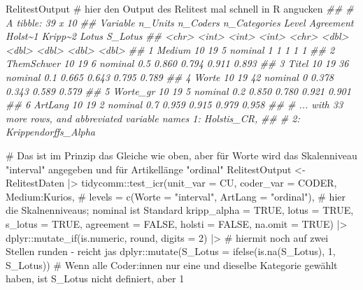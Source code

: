 \documentclass[twoside, pagesize, fontsize=11pt, dvipsnames]{scrreport}
\newenvironment{Shaded}{\begin{snugshade}}{\end{snugshade}}
\newcommand{\AttributeTok}[1]{\textcolor[rgb]{0.40,0.45,0.13}{#1}}
\newcommand{\CommentTok}[1]{\textcolor[rgb]{0.37,0.37,0.37}{#1}}
\newcommand{\ConstantTok}[1]{\textcolor[rgb]{0.56,0.35,0.01}{#1}}
\newcommand{\DecValTok}[1]{\textcolor[rgb]{0.68,0.00,0.00}{#1}}
\newcommand{\DocumentationTok}[1]{\textcolor[rgb]{0.37,0.37,0.37}{\textit{#1}}}
\newcommand{\FunctionTok}[1]{\textcolor[rgb]{0.28,0.35,0.67}{#1}}
\newcommand{\NormalTok}[1]{\textcolor[rgb]{0.00,0.23,0.31}{#1}}
\newcommand{\OtherTok}[1]{\textcolor[rgb]{0.00,0.23,0.31}{#1}}
\newcommand{\SpecialCharTok}[1]{\textcolor[rgb]{0.37,0.37,0.37}{#1}}
\newcommand{\StringTok}[1]{\textcolor[rgb]{0.13,0.47,0.30}{#1}}
\begin{document}
\begin{Shaded}
\begin{Highlighting}[]
\NormalTok{RelitestOutput }\CommentTok{\# hier den Output des Relitest mal schnell in R angucken}
\DocumentationTok{\#\# \# A tibble: 39 x 10}
\DocumentationTok{\#\#   Variable   n\_Units n\_Coders n\_Categories Level   Agreement Holst\textasciitilde{}1 Kripp\textasciitilde{}2 Lotus S\_Lotus}
\DocumentationTok{\#\#   \textless{}chr\textgreater{}        \textless{}int\textgreater{}    \textless{}int\textgreater{}        \textless{}int\textgreater{} \textless{}chr\textgreater{}       \textless{}dbl\textgreater{}   \textless{}dbl\textgreater{}   \textless{}dbl\textgreater{} \textless{}dbl\textgreater{}   \textless{}dbl\textgreater{}}
\DocumentationTok{\#\# 1 Medium          10       19            5 nominal       1     1       1     1       1    }
\DocumentationTok{\#\# 2 ThemSchwer      10       19            6 nominal       0.5   0.860   0.794 0.911   0.893}
\DocumentationTok{\#\# 3 Titel           10       19           36 nominal       0.1   0.665   0.643 0.795   0.789}
\DocumentationTok{\#\# 4 Worte           10       19           42 nominal       0     0.378   0.343 0.589   0.579}
\DocumentationTok{\#\# 5 Worte\_gr        10       19            5 nominal       0.2   0.850   0.780 0.921   0.901}
\DocumentationTok{\#\# 6 ArtLang         10       19            2 nominal       0.7   0.959   0.915 0.979   0.958}
\DocumentationTok{\#\# \# ... with 33 more rows, and abbreviated variable names 1: Holstis\_CR,}
\DocumentationTok{\#\# \#   2: Krippendorffs\_Alpha}

\CommentTok{\# Das ist im Prinzip das Gleiche wie oben, aber für Worte wird das Skalenniveau "interval" angegeben und für Artikellänge "ordinal"}
\NormalTok{RelitestOutput }\OtherTok{\textless{}{-}}\NormalTok{ RelitestDaten }\SpecialCharTok{|\textgreater{}} 
\NormalTok{tidycomm}\SpecialCharTok{::}\FunctionTok{test\_icr}\NormalTok{(}\AttributeTok{unit\_var =}\NormalTok{ CU, }\AttributeTok{coder\_var =}\NormalTok{ CODER, Medium}\SpecialCharTok{:}\NormalTok{Kurios, }\CommentTok{\# }
           \AttributeTok{levels =} \FunctionTok{c}\NormalTok{(}\AttributeTok{Worte =} \StringTok{"interval"}\NormalTok{, }\AttributeTok{ArtLang =} \StringTok{"ordinal"}\NormalTok{), }\CommentTok{\# hier die Skalnenniveaus; nominal ist Standard}
           \AttributeTok{kripp\_alpha =} \ConstantTok{TRUE}\NormalTok{, }\AttributeTok{lotus =} \ConstantTok{TRUE}\NormalTok{, }\AttributeTok{s\_lotus =} \ConstantTok{TRUE}\NormalTok{, }\AttributeTok{agreement =} \ConstantTok{FALSE}\NormalTok{, }\AttributeTok{holsti =} \ConstantTok{FALSE}\NormalTok{, }\AttributeTok{na.omit =} \ConstantTok{TRUE}\NormalTok{) }\SpecialCharTok{|\textgreater{}} 
\NormalTok{    dplyr}\SpecialCharTok{::}\FunctionTok{mutate\_if}\NormalTok{(is.numeric, round, }\AttributeTok{digits =} \DecValTok{2}\NormalTok{) }\SpecialCharTok{|\textgreater{}}  \CommentTok{\# hiermit noch auf zwei Stellen runden {-} reicht jas}
\NormalTok{    dplyr}\SpecialCharTok{::}\FunctionTok{mutate}\NormalTok{(}\AttributeTok{S\_Lotus =} \FunctionTok{ifelse}\NormalTok{(}\FunctionTok{is.na}\NormalTok{(S\_Lotus), }\DecValTok{1}\NormalTok{, S\_Lotus)) }\CommentTok{\# Wenn alle Coder:innen nur eine und dieselbe Kategorie gewählt haben, ist S\_Lotus nicht definiert, aber 1}



\end{Highlighting}
\end{Shaded}
\end{document}
